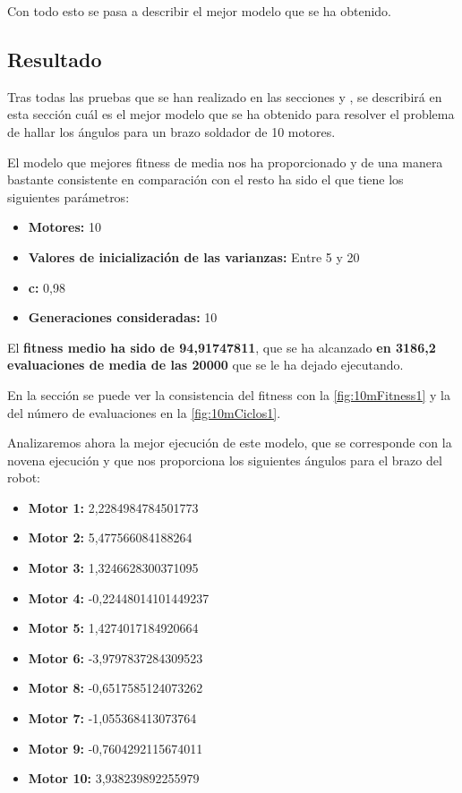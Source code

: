 \documentclass[12pt, spanish, pdftex]{UC3M_document}
\begin{document}
Con todo esto se pasa a describir el mejor modelo que se ha obtenido.

\subsection{Resultado}\label{sec:resultado}
Tras todas las pruebas que se han realizado en las secciones  y , se describirá en esta sección cuál es el mejor modelo que se ha obtenido para resolver el problema de hallar los ángulos para un brazo soldador de 10 motores.

El modelo que mejores fitness de media nos ha proporcionado y de una manera bastante consistente en comparación con el resto ha sido el que tiene los siguientes parámetros:
\begin{itemize}
	\item \textbf{Motores:} 10
	\item \textbf{Valores de inicialización de las varianzas:} Entre 5 y 20
	\item \textbf{c:} 0,98
	\item \textbf{Generaciones consideradas:} 10
\end{itemize}
El \textbf{fitness medio ha sido de 94,91747811}, que se ha alcanzado \textbf{en 3186,2 evaluaciones de media de las 20000} que se le ha dejado ejecutando.

En la sección  se puede ver la consistencia del fitness con la \autoref{fig:10mFitness1} y la del número de evaluaciones en la \autoref{fig:10mCiclos1}.

\pagebreak

Analizaremos ahora la mejor ejecución de este modelo, que se corresponde con la novena ejecución y que nos proporciona los siguientes ángulos para el brazo del robot:
\begin{itemize}
	\item \textbf{Motor 1:} 2,2284984784501773
	\item \textbf{Motor 2:} 5,477566084188264
	\item \textbf{Motor 3:} 1,3246628300371095
	\item \textbf{Motor 4:} -0,22448014101449237
	\item \textbf{Motor 5:} 1,4274017184920664
	\item \textbf{Motor 6:} -3,9797837284309523
	\item \textbf{Motor 8:} -0,6517585124073262
	\item \textbf{Motor 7:} -1,055368413073764 
	\item \textbf{Motor 9:} -0,7604292115674011
	\item \textbf{Motor 10:} 3,938239892255979
\end{itemize}
\end{document}
